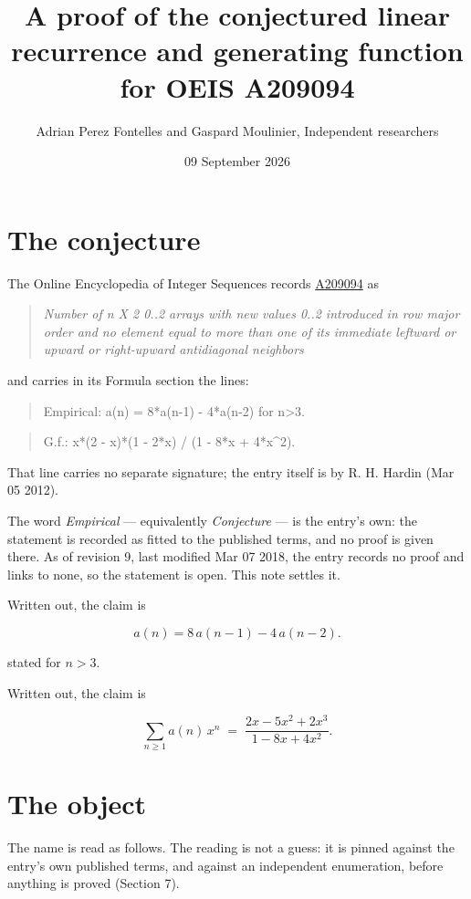 \documentclass[11pt]{article}
\title{A proof of the conjectured linear recurrence and generating function for OEIS A209094}
\author{Adrian Perez Fontelles and Gaspard Moulinier, Independent researchers}
\date{09 September 2026}
\theoremstyle{definition}
\begin{document}
\maketitle
\section{The conjecture}

The Online Encyclopedia of Integer Sequences records \href{https://oeis.org/A209094}{A209094} as

\begin{quote}\itshape Number of n X 2 0..2 arrays with new values 0..2 introduced in row major order and no element equal to more than one of its immediate leftward or upward or right-upward antidiagonal neighbors\end{quote}

and carries in its Formula section the lines:

\begin{quote}\ttfamily Empirical: a(n) = 8*a(n-1) - 4*a(n-2) for n>3.\end{quote}

\begin{quote}\ttfamily G.f.: x*(2 - x)*(1 - 2*x) / (1 - 8*x + 4*x\textasciicircum{}2).\end{quote}

That line carries no separate signature; the entry itself is by R. H. Hardin (Mar 05 2012).

The word {\itshape Empirical} --- equivalently {\itshape Conjecture} --- is the entry's own: the statement is recorded as fitted to the published terms, and no proof is given there. As of revision 9, last modified Mar 07 2018, the entry records no proof and links to none, so the statement is open. This note settles it.

Written out, the claim is

\[a(n) = 8\,a(n-1) - 4\,a(n-2).\]

stated for $n > 3$.

Written out, the claim is

\[\sum_{n \ge 1} a(n)\,x^n \;=\; \frac{2x - 5x^{2} + 2x^{3}}{1 - 8x + 4x^{2}}.\]

\section{The object}

The name is read as follows. The reading is not a guess: it is pinned against the entry's own published terms, and against an independent enumeration, before anything is proved (Section 7).
\end{document}
